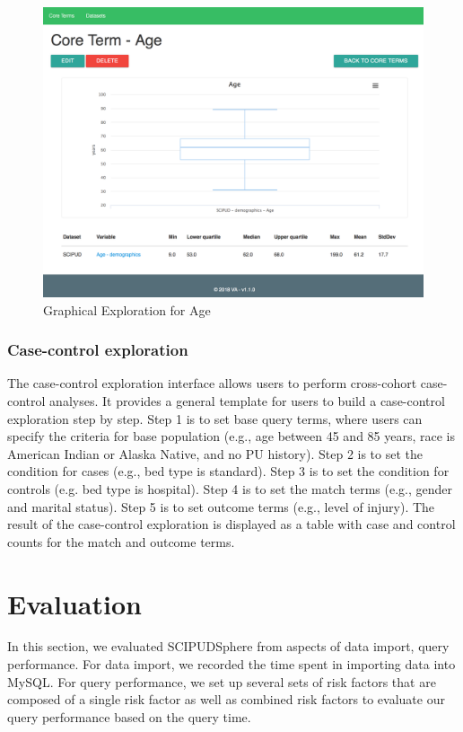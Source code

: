 \documentclass{amia}
\begin{document}
\begin{figure}[h!]
  \centering
  \includegraphics[scale=0.35]{pics/graphical.png}
  \caption{Graphical Exploration for Age}
  \label{graphical}
\end{figure}

\subsubsection{Case-control exploration}
The case-control exploration interface allows users to perform cross-cohort case-control analyses. It provides a general template for users to build a case-control exploration step by step. Step 1 is to set base query terms, where users can specify the criteria for base population (e.g., age between 45 and 85 years, race is American Indian or Alaska Native, and no PU history). Step 2 is to set the condition for cases (e.g., bed type is standard). Step 3 is to set the condition for controls (e.g. bed type is hospital). Step 4 is to set the match terms (e.g., gender and marital status). Step 5 is to set outcome terms (e.g., level of injury). The result of the case-control exploration is displayed as a table with case and control counts for the match and outcome terms.

\section{Evaluation}
In this section, we evaluated SCIPUDSphere from aspects of data import, query performance. For data import, we recorded the time spent in importing data into MySQL. For query performance, we set up several sets of risk factors that are composed of a  single risk factor as well as combined risk factors to evaluate our query performance based on the query time.
\end{document}
